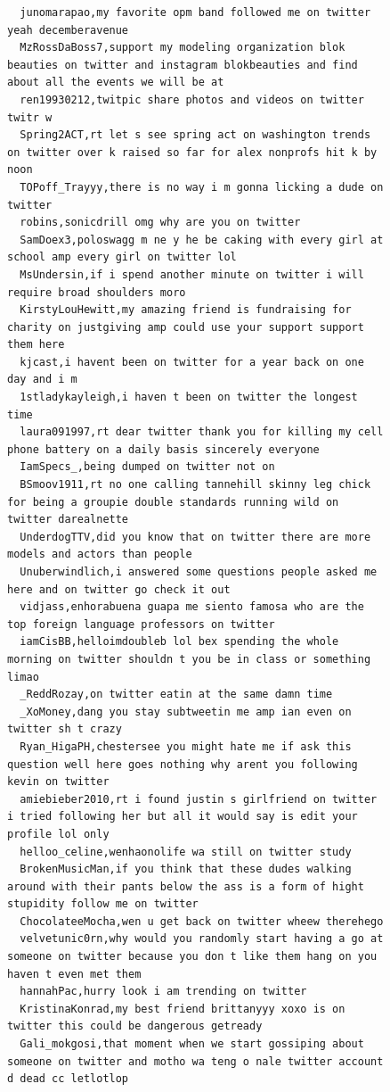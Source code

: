 \begin{figure}[htpb]
\begin{verbatim}
  junomarapao,my favorite opm band followed me on twitter yeah decemberavenue
  MzRossDaBoss7,support my modeling organization blok beauties on twitter and instagram blokbeauties and find about all the events we will be at
  ren19930212,twitpic share photos and videos on twitter twitr w
  Spring2ACT,rt let s see spring act on washington trends on twitter over k raised so far for alex nonprofs hit k by noon
  TOPoff_Trayyy,there is no way i m gonna licking a dude on twitter
  robins,sonicdrill omg why are you on twitter
  SamDoex3,poloswagg m ne y he be caking with every girl at school amp every girl on twitter lol
  MsUndersin,if i spend another minute on twitter i will require broad shoulders moro
  KirstyLouHewitt,my amazing friend is fundraising for charity on justgiving amp could use your support support them here
  kjcast,i havent been on twitter for a year back on one day and i m
  1stladykayleigh,i haven t been on twitter the longest time
  laura091997,rt dear twitter thank you for killing my cell phone battery on a daily basis sincerely everyone
  IamSpecs_,being dumped on twitter not on
  BSmoov1911,rt no one calling tannehill skinny leg chick for being a groupie double standards running wild on twitter darealnette
  UnderdogTTV,did you know that on twitter there are more models and actors than people
  Unuberwindlich,i answered some questions people asked me here and on twitter go check it out
  vidjass,enhorabuena guapa me siento famosa who are the top foreign language professors on twitter
  iamCisBB,helloimdoubleb lol bex spending the whole morning on twitter shouldn t you be in class or something limao
  _ReddRozay,on twitter eatin at the same damn time
  _XoMoney,dang you stay subtweetin me amp ian even on twitter sh t crazy
  Ryan_HigaPH,chestersee you might hate me if ask this question well here goes nothing why arent you following kevin on twitter
  amiebieber2010,rt i found justin s girlfriend on twitter i tried following her but all it would say is edit your profile lol only
  helloo_celine,wenhaonolife wa still on twitter study
  BrokenMusicMan,if you think that these dudes walking around with their pants below the ass is a form of hight stupidity follow me on twitter
  ChocolateeMocha,wen u get back on twitter wheew therehego
  velvetunic0rn,why would you randomly start having a go at someone on twitter because you don t like them hang on you haven t even met them
  hannahPac,hurry look i am trending on twitter
  KristinaKonrad,my best friend brittanyyy xoxo is on twitter this could be dangerous getready
  Gali_mokgosi,that moment when we start gossiping about someone on twitter and motho wa teng o nale twitter account d dead cc letlotlop

\end{verbatim}
\end{figure}
